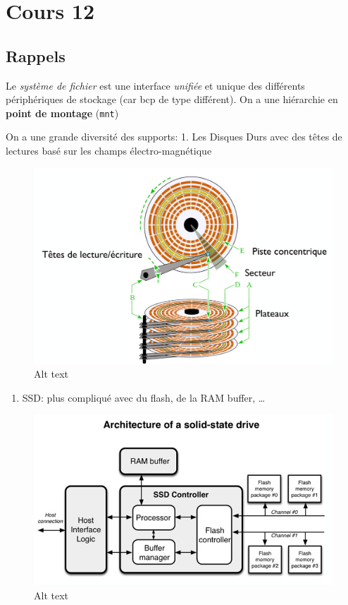 \section{Cours 12}\label{cours-12}

\subsection{Rappels}\label{rappels}

Le \emph{système de fichier} est une interface \emph{unifiée} et unique
des différents périphériques de stockage (car bcp de type différent). On
a une hiérarchie en \textbf{point de montage} (\texttt{mnt})

On a une grande diversité des supports: 1. Les Disques Durs avec des
têtes de lectures basé sur les champs électro-magnétique

\begin{figure}
\centering
\includegraphics{image-35.png}
\caption{Alt text}
\end{figure}

\begin{enumerate}
\def\labelenumi{\arabic{enumi}.}
\setcounter{enumi}{1}
\tightlist
\item
  SSD: plus compliqué avec du flash, de la RAM buffer, \ldots{}
\end{enumerate}

\begin{figure}
\centering
\includegraphics{image-36.png}
\caption{Alt text}
\end{figure}

